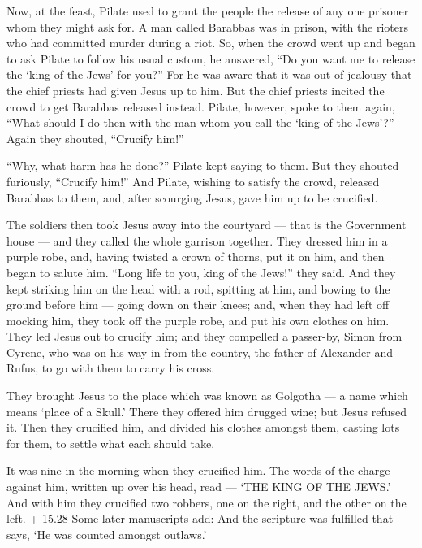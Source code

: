  Now, at the feast, Pilate used to grant the people the
release of any one prisoner whom they might ask for.  A man
called Barabbas was in prison, with the rioters who had committed murder
during a riot.  So, when the crowd went up and began to ask
Pilate to follow his usual custom,  he answered, ``Do you
want me to release the `king of the Jews' for you?''  For
he was aware that it was out of jealousy that the chief priests had
given Jesus up to him.  But the chief priests incited the
crowd to get Barabbas released instead.  Pilate, however,
spoke to them again, ``What should I do then with the man whom you call
the `king of the Jews'?''  Again they shouted, ``Crucify
him!''

 ``Why, what harm has he done?'' Pilate kept saying to
them. But they shouted furiously, ``Crucify him!''  And
Pilate, wishing to satisfy the crowd, released Barabbas to them, and,
after scourging Jesus, gave him up to be crucified.

 The soldiers then took Jesus away into the courtyard ---
that is the Government house --- and they called the whole garrison
together.  They dressed him in a purple robe, and, having
twisted a crown of thorns, put it on him,  and then began
to salute him. ``Long life to you, king of the Jews!'' they said.
 And they kept striking him on the head with a rod,
spitting at him, and bowing to the ground before him --- going down on
their knees;  and, when they had left off mocking him, they
took off the purple robe, and put his own clothes on him. 
They led Jesus out to crucify him; and they compelled a passer-by, Simon
from Cyrene, who was on his way in from the country, the father of
Alexander and Rufus, to go with them to carry his cross.

 They brought Jesus to the place which was known as
Golgotha --- a name which means `place of a Skull.'  There
they offered him drugged wine; but Jesus refused it.  Then
they crucified him, and divided his clothes amongst them, casting lots
for them, to settle what each should take.

 It was nine in the morning when they crucified him.
 The words of the charge against him, written up over his
head, read --- `THE KING OF THE JEWS.'  And with him they
crucified two robbers, one on the right, and the other on the left.
 + 15.28 Some later manuscripts add: And the scripture was
fulfilled that says, `He was counted amongst outlaws.'

